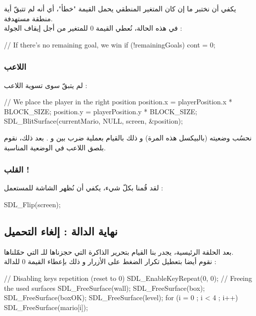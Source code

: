 يكفي أن نختبر ما إن كان المتغير المنطقي يحمل القيمة "خطأ"، أي أنه لم تتبقّ أية منطقة مستهدفة.\\
في هذه الحالة، نُعطي القيمة 0 للمتغير
من أجل إيقاف الجولة :

\begin{Csource}
// If there's no remaining goal, we win
if (!remainingGoals)
	cont = 0;
\end{Csource}

\subsubsection{اللاعب}

لم يتبقّ سوى تسوية اللاعب :

\begin{Csource}
// We place the player in the right position
position.x = playerPosition.x * BLOCK_SIZE;
position.y = playerPosition.y * BLOCK_SIZE;
SDL_BlitSurface(currentMario, NULL, screen, &position);
\end{Csource}

نحسُب وضعيته (بالبيكسل هذه المرة) و ذلك بالقيام بعملية ضرب بين
و
.
بعد ذلك، نقوم بلصق اللاعب في الوضعية المناسبة.

\subsubsection{القلب !}

لقد قُمنا بكلّ شيء، يكفي أن نُظهر الشاشة للمستعمل :

\begin{Csource}
SDL_Flip(screen);
\end{Csource}

\subsection{نهاية الدالة : إلغاء التحميل}

بعد الحلقة الرئيسية، يجدر بنا القيام بتحرير الذاكرة التي حجزناها للـ
التي حمّلناها.\\
نقوم أيضا بتعطيل تكرار الضغط على الأزرار و ذلك بإعطاء القيمة 0 للدالة
 :

\begin{Csource}
// Disabling keys repetition (reset to 0)
SDL_EnableKeyRepeat(0, 0);
// Freeing the used surfaces
SDL_FreeSurface(wall);
SDL_FreeSurface(box);
SDL_FreeSurface(boxOK);
SDL_FreeSurface(level);
for (i = 0 ; i < 4 ; i++)
	SDL_FreeSurface(mario[i]);
\end{Csource}

